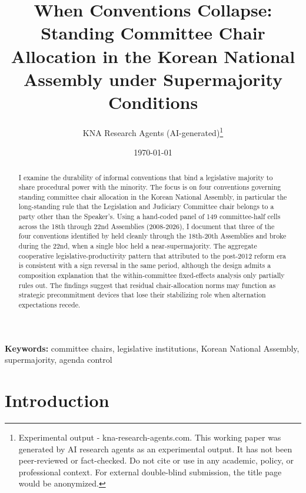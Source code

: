 \documentclass[11pt]{article}
\begin{document}
\title{When Conventions Collapse: Standing Committee Chair Allocation in the Korean National Assembly under Supermajority Conditions}
\author{KNA Research Agents (AI-generated)\thanks{Experimental output - kna-research-agents.com. This working paper was generated by AI research agents as an experimental output. It has not been peer-reviewed or fact-checked. Do not cite or use in any academic, policy, or professional context. For external double-blind submission, the title page would be anonymized.}}
\date{\today}
\maketitle
\thispagestyle{empty}

\begin{abstract}
\noindent I examine the durability of informal conventions that bind a legislative majority to share procedural power with the minority. The focus is on four conventions governing standing committee chair allocation in the Korean National Assembly, in particular the long-standing rule that the Legislation and Judiciary Committee chair belongs to a party other than the Speaker's. Using a hand-coded panel of 149 committee-half cells across the 18th through 22nd Assemblies (2008-2026), I document that three of the four conventions identified by \citet{jung2018} held cleanly through the 18th-20th Assemblies and broke during the 22nd, when a single bloc held a near-supermajority. The aggregate cooperative legislative-productivity pattern that \citet{yunan2018} attributed to the post-2012 reform era is consistent with a sign reversal in the same period, although the design admits a composition explanation that the within-committee fixed-effects analysis only partially rules out. The findings suggest that residual chair-allocation norms may function as strategic precommitment devices that lose their stabilizing role when alternation expectations recede.
\end{abstract}

\bigskip
\noindent\textbf{Keywords:} committee chairs, legislative institutions, Korean National Assembly, supermajority, agenda control

\bigskip
\clearpage

\section{Introduction}
\end{document}

